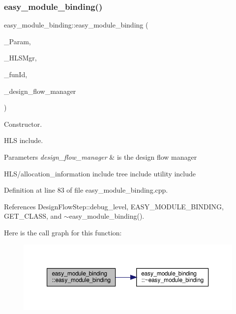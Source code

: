 \subsubsection{\texorpdfstring{easy\+\_\+module\+\_\+binding()}{easy\_module\_binding()}}
{\footnotesize\ttfamily easy\+\_\+module\+\_\+binding\+::easy\+\_\+module\+\_\+binding (\begin{DoxyParamCaption}\item[{const \hyperlink{Parameter_8hpp_a37841774a6fcb479b597fdf8955eb4ea}{Parameter\+Const\+Ref}}]{\+\_\+\+Param,  }\item[{const \hyperlink{hls__manager_8hpp_acd3842b8589fe52c08fc0b2fcc813bfe}{H\+L\+S\+\_\+manager\+Ref}}]{\+\_\+\+H\+L\+S\+Mgr,  }\item[{unsigned int}]{\+\_\+fun\+Id,  }\item[{const Design\+Flow\+Manager\+Const\+Ref}]{\+\_\+design\+\_\+flow\+\_\+manager }\end{DoxyParamCaption})}



Constructor. 

H\+LS include.


\begin{DoxyParams}{Parameters}
{\em design\+\_\+flow\+\_\+manager} & is the design flow manager\\
\hline
\end{DoxyParams}
H\+L\+S/allocation\+\_\+information include tree include utility include 

Definition at line 83 of file easy\+\_\+module\+\_\+binding.\+cpp.



References Design\+Flow\+Step\+::debug\+\_\+level, E\+A\+S\+Y\+\_\+\+M\+O\+D\+U\+L\+E\+\_\+\+B\+I\+N\+D\+I\+NG, G\+E\+T\+\_\+\+C\+L\+A\+SS, and $\sim$easy\+\_\+module\+\_\+binding().

Here is the call graph for this function\+:
\nopagebreak
\begin{figure}[H]
\begin{center}
\leavevmode
\includegraphics[width=350pt]{d6/d61/classeasy__module__binding_a76bb79e104fdca6cea8642102ddda297_cgraph}
\end{center}
\end{figure}
\mbox{\label{classeasy__module__binding_ac6a6c816be4fbcde190f813b8e6c5172}} 
